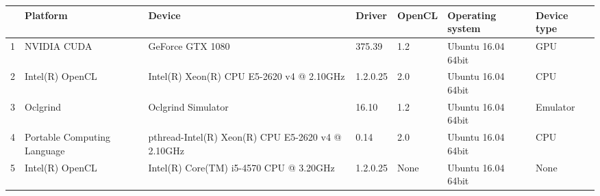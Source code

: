 \begin{tabular}{lllllll}
\toprule
{} &                     Platform &                                             Device &    Driver & OpenCL &    Operating system & Device type \\
\midrule
1 &                  NVIDIA CUDA &                                   GeForce GTX 1080 &    375.39 &    1.2 &  Ubuntu 16.04 64bit &         GPU \\
2 &              Intel(R) OpenCL &          Intel(R) Xeon(R) CPU E5-2620 v4 @ 2.10GHz &  1.2.0.25 &    2.0 &  Ubuntu 16.04 64bit &         CPU \\
3 &                     Oclgrind &                                 Oclgrind Simulator &     16.10 &    1.2 &  Ubuntu 16.04 64bit &    Emulator \\
4 &  Portable Computing Language &  pthread-Intel(R) Xeon(R) CPU E5-2620 v4 @ 2.10GHz &      0.14 &    2.0 &  Ubuntu 16.04 64bit &         CPU \\
5 &              Intel(R) OpenCL &            Intel(R) Core(TM) i5-4570 CPU @ 3.20GHz &  1.2.0.25 &   None &  Ubuntu 16.04 64bit &        None \\
\bottomrule
\end{tabular}
